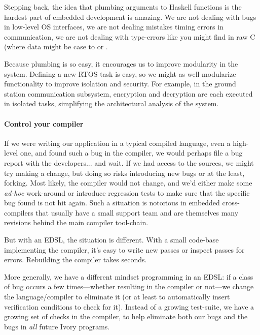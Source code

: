 Stepping back, the idea that plumbing arguments to Haskell functions is the
hardest part of embedded development is amazing.  We are not dealing with bugs
in low-level OS interfaces, we are not dealing mistakes timing errors in
communication, we are not dealing with type-errors like you might find in raw C
(where data might be case to  or .

Because plumbing is so easy, it encourages us to improve modularity in the
system.  Defining a new RTOS task is easy, so we might as well modularize
functionality to improve isolation and security.  For example, in the ground
station communication subsystem, encryption and decryption are each executed in
isolated tasks, simplifying the architectural analysis of the system.

\paragraph{Control your compiler}
If we were writing our application in a typical compiled language, even a
high-level one, and found such a bug in the compiler, we would perhaps file a
bug report with the developers... and wait.  If we had access to the sources, we
might try making a change, but doing so risks introducing new bugs or at the
least, forking.  Most likely, the compiler would not change, and we’d either
make some \emph{ad-hoc} work-around or introduce regression tests to make sure
that the specific bug found is not hit again.  Such a situation is notorious in
embedded cross-compilers that usually have a small support team and are
themselves many revisions behind the main compiler tool-chain.

But with an EDSL, the situation is different.  With a small code-base
implementing the compiler, it’s easy to write new passes or inspect passes for
errors.  Rebuilding the compiler takes seconds.

More generally, we have a different mindset programming in an EDSL: if a class
of bug occurs a few times---whether resulting in the compiler or not---we change
the language/compiler to eliminate it (or at least to automatically insert
verification conditions to check for it).  Instead of a growing test-suite, we
have a growing set of checks in the compiler, to help eliminate both our bugs
and the bugs in \emph{all} future Ivory programs.

